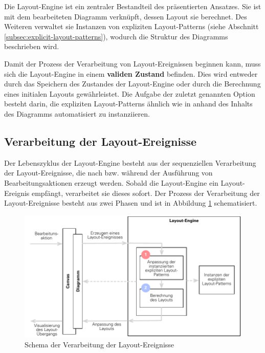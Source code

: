 Die Layout-Engine ist ein zentraler Bestandteil des präsentierten Ansatzes. Sie ist mit dem bearbeiteten Diagramm verknüpft, dessen Layout sie berechnet. Des Weiteren verwaltet sie Instanzen von expliziten Layout-Patterns (siehe Abschnitt \ref{subsec:explicit-layout-patterns}), wodurch die Struktur des Diagramms beschrieben wird.

Damit der Prozess der Verarbeitung von Layout-Ereignissen beginnen kann, muss sich die Layout-Engine in einem \textbf{validen Zustand} befinden. Dies wird entweder durch das Speichern des Zustandes der Layout-Engine oder durch die Berechnung eines initialen Layouts gewährleistet. Die Aufgabe der zuletzt genannten Option besteht darin, die expliziten Layout-Patterns ähnlich wie in \cite{MaierMinas13A-Pattern-based} anhand des Inhalts des Diagramms automatisiert zu instanziieren.

\subsection{Verarbeitung der Layout-Ereignisse}
\label{subsec:processing-of-layout-events}

Der Lebenszyklus der Layout-Engine besteht aus der sequenziellen Verarbeitung der Layout-Ereignisse, die nach bzw. während der Ausführung von Bearbeitungsaktionen erzeugt werden. Sobald die Layout-Engine ein Layout-Ereignis empfängt, verarbeitet sie dieses sofort. Der Prozess der Verarbeitung der Layout-Ereignisse besteht aus zwei Phasen und ist in Abbildung \ref{fig:processing-of-layout-events} schematisiert.

\begin{figure}[hbt]
    \centering
    \includegraphics[width=\textwidth]{resources/processing-of-layout-events}
    \caption{Schema der Verarbeitung der Layout-Ereignisse}
    \label{fig:processing-of-layout-events}
\end{figure}

